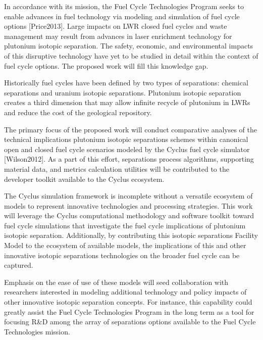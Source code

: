 \documentclass[a4paper, 12pt]{article}
\begin{document}
In accordance with its mission, the Fuel Cycle Technologies Program seeks to
enable advances in fuel technology via modeling and simulation of fuel cycle
options [Price2013]. Large impacts on LWR closed fuel cycles and waste
management may result from advances in laser enrichment technology for
plutonium isotopic separation. The safety, economic, and environmental impacts
of this disruptive technology have yet to be studied in detail within the
context of fuel cycle options. The proposed work will fill this knowledge gap.

Historically fuel cycles have been defined by two types of separations:
chemical separations and uranium isotopic separations. Plutonium isotopic
separation creates a third dimension that may allow infinite recycle of
plutonium in LWRs and reduce the cost of the geological repository.  

The primary focus of the proposed work will conduct comparative analyses of the
technical implications plutonium isotopic separations schemes within canonical
open and closed fuel cycle scenarios modeled by the Cyclus fuel cycle simulator
[Wilson2012]. As a part of this effort, separations process algorithms,
supporting material data, and metrics calculation utilities will be contributed
to the developer toolkit available to the Cyclus ecosystem. 

The Cyclus simulation framework is incomplete without a versatile ecosystem of
models to represent innovative technologies and processing strategies. This
work will leverage the Cyclus computational methodology and software toolkit
toward fuel cycle simulations that investigate the fuel cycle implications of
plutonium isotopic separation. Additionally, by contributing this isotopic
separations Facility Model to the ecosystem of available models, the
implications of this and other innovative isotopic separations technologies on
the broader fuel cycle can be captured. 

Emphasis on the ease of use of these models will seed collaboration with
researchers interested in modeling additional technology and policy impacts of
other innovative isotopic separation concepts. For instance, this capability
could greatly assist the Fuel Cycle Technologies Program in the long term as a
tool for focusing R&D among the array of separations options available to the
Fuel Cycle Technologies mission.
\end{document}

